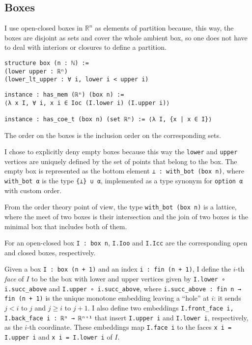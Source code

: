 \documentclass[a4paper, UKenglish,cleveref, autoref, thm-restate]{lipics-v2021}
\newcommand{\bbR}{\mathbb{R}}
\begin{document}
\subsection{Boxes}\label{sec:boxes}

I use open-closed boxes in \(\bbR^{n}\) as elements of partition
because, this way, the boxes are disjoint as sets and cover the whole
ambient box, so one does not have to deal with interiors or closures
to define a partition.

\begin{lstlisting}[caption=Definition of a box]
structure box (n : ℕ) :=
(lower upper : ℝⁿ)
(lower_lt_upper : ∀ i, lower i < upper i)
\end{lstlisting}

\begin{lstlisting}[caption=The set defined by a box]
instance : has_mem (ℝⁿ) (box n) :=
⟨λ x I, ∀ i, x i ∈ Ioc (I.lower i) (I.upper i)⟩

instance : has_coe_t (box n) (set ℝⁿ) := ⟨λ I, {x | x ∈ I}⟩
\end{lstlisting}
The order on the boxes is the inclusion order on the corresponding
sets.

I chose to explicitly deny empty boxes because this way the
\lstinline{lower} and \lstinline{upper} vertices are uniquely defined
by the set of points that belong to the box. The empty box is
represented as the bottom element \lstinline{⊥ : with_bot (box n)},
where \lstinline{with_bot α} is the type \lstinline={⊥} ∪ α=,
implemented as a type synonym for \lstinline{option α} with custom order.

From the order theory point of view, the type
\lstinline=with_bot (box n)= is a lattice, where the meet of two boxes
is their intersection and the join of two boxes is the minimal box
that includes both of them.

For an open-closed box \lstinline{I : box n}, \lstinline{I.Ioo} and
\lstinline{I.Icc} are the corresponding open and closed boxes,
respectively.

Given a box \lstinline=I : box (n + 1)= and an index
\lstinline=i : fin (n + 1)=, I define the \(i\)-th \emph{face} of
\(I\) to be the box with lower and upper vertices given by
\lstinline=I.lower ∘ i.succ_above= and
\lstinline=I.upper ∘ i.succ_above=, where
\lstinline=i.succ_above : fin n → fin (n + 1)= is the unique monotone
embedding leaving a \enquote{hole} at \(i\): it sends \(j<i\) to \(j\)
and \(j\ge i\) to \(j+1\). I also define two embeddings
\lstinline=I.front_face i, I.back_face i : ℝⁿ → ℝⁿ⁺¹= that insert
\lstinline=I.upper i= and \lstinline=I.lower i=, respectively, as the
\(i\)-th coordinate. These embeddings map \lstinline=I.face i= to
the faces \lstinline+x i = I.upper i+ and \lstinline+x i = I.lower i+
of \(I\).
\end{document}
